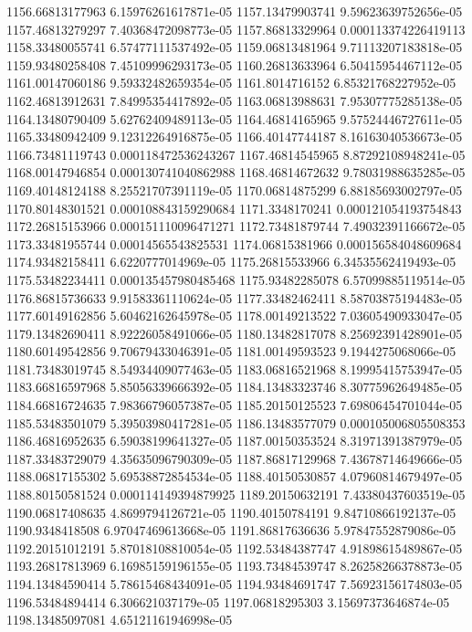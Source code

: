 {1156.66813177963 6.15976261617871e-05
1157.13479903741 9.59623639752656e-05
1157.46813279297 7.40368472098773e-05
1157.86813329964 0.000113374226419113
1158.33480055741 6.57477111537492e-05
1159.06813481964 9.71113207183818e-05
1159.93480258408 7.45109996293173e-05
1160.26813633964 6.50415954467112e-05
1161.00147060186 9.59332482659354e-05
1161.8014716152 6.85321768227952e-05
1162.46813912631 7.84995354417892e-05
1163.06813988631 7.95307775285138e-05
1164.13480790409 5.62762409489113e-05
1164.46814165965 9.57524446727611e-05
1165.33480942409 9.12312264916875e-05
1166.40147744187 8.16163040536673e-05
1166.73481119743 0.000118472536243267
1167.46814545965 8.87292108948241e-05
1168.00147946854 0.000130741040862988
1168.46814672632 9.78031988635285e-05
1169.40148124188 8.25521707391119e-05
1170.06814875299 6.88185693002797e-05
1170.80148301521 0.000108843159290684
1171.3348170241 0.000121054193754843
1172.26815153966 0.000151110096471271
1172.73481879744 7.49032391166672e-05
1173.33481955744 0.00014565543825531
1174.06815381966 0.000156584048609684
1174.93482158411 6.6220777014969e-05
1175.26815533966 6.34535562419493e-05
1175.53482234411 0.000135457980485468
1175.93482285078 6.57099885119514e-05
1176.86815736633 9.91583361110624e-05
1177.33482462411 8.58703875194483e-05
1177.60149162856 5.60462162645978e-05
1178.00149213522 7.03605490933047e-05
1179.13482690411 8.92226058491066e-05
1180.13482817078 8.25692391428901e-05
1180.60149542856 9.70679433046391e-05
1181.00149593523 9.1944275068066e-05
1181.73483019745 8.54934409077463e-05
1183.06816521968 8.19995415753947e-05
1183.66816597968 5.85056339666392e-05
1184.13483323746 8.30775962649485e-05
1184.66816724635 7.98366796057387e-05
1185.20150125523 7.69806454701044e-05
1185.53483501079 5.39503980417281e-05
1186.13483577079 0.000105006805508353
1186.46816952635 6.59038199641327e-05
1187.00150353524 8.31971391387979e-05
1187.33483729079 4.35635096790309e-05
1187.86817129968 7.43678714649666e-05
1188.06817155302 5.69538872854534e-05
1188.40150530857 4.07960814679497e-05
1188.80150581524 0.000114149394879925
1189.20150632191 7.43380437603519e-05
1190.06817408635 4.8699794126721e-05
1190.40150784191 9.84710866192137e-05
1190.9348418508 6.97047469613668e-05
1191.86817636636 5.97847552879086e-05
1192.20151012191 5.87018108810054e-05
1192.53484387747 4.91898615489867e-05
1193.26817813969 6.16985159196155e-05
1193.73484539747 8.26258266378873e-05
1194.13484590414 5.78615468434091e-05
1194.93484691747 7.56923156174803e-05
1196.53484894414 6.306621037179e-05
1197.06818295303 3.15697373646874e-05
1198.13485097081 4.65121161946998e-05
}
